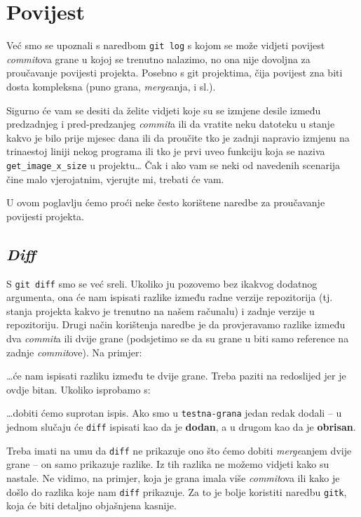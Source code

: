 \chapter*{Povijest}

Već smo se upoznali s naredbom \verb+git log+ s kojom se može vidjeti povijest \emph{commit}ova grane u kojoj se trenutno nalazimo, no ona nije dovoljna za proučavanje povijesti projekta.
Posebno s git projektima, čija povijest zna biti dosta kompleksna (puno grana, \emph{merge}anja, i sl.).

Sigurno će vam se desiti da želite vidjeti koje su se izmjene desile između predzadnjeg i pred-predzanjeg \emph{commit}a ili da vratite neku datoteku u stanje kakvo je bilo prije mjesec dana ili da proučite tko je zadnji napravio izmjenu na trinaestoj liniji nekog programa ili tko je prvi uveo funkciju koja se naziva \verb+get_image_x_size+ u projektu\dots 
Čak i ako vam se neki od navedenih scenarija čine malo vjerojatnim, vjerujte mi, trebati će vam.

U ovom poglavlju ćemo proći neke često korištene naredbe za proučavanje povijesti projekta.

\section*{\emph{Diff}}

S \verb+git diff+ smo se već sreli. 
Ukoliko ju pozovemo bez ikakvog dodatnog argumenta, ona će nam ispisati razlike između radne verzije repozitorija (tj. stanja projekta kakvo je trenutno na našem računalu) i zadnje verzije u repozitoriju.
Drugi način korištenja naredbe je da provjeravamo razlike između dva \emph{commit}a ili dvije grane (podsjetimo se da su grane u biti samo reference na zadnje \emph{commit}ove).
Na primjer:


\dots{}će nam ispisati razliku između te dvije grane. 
Treba paziti na redoslijed jer je ovdje bitan.
Ukoliko isprobamo s:


\dots{}dobiti ćemo suprotan ispis. 
Ako smo u \verb+testna-grana+ jedan redak dodali -- u jednom slučaju će \verb+diff+ ispisati kao da je \textbf{dodan}, a u drugom kao da je \textbf{obrisan}.

Treba imati na umu da \verb+diff+ ne prikazuje ono što ćemo dobiti \emph{merge}anjem dvije grane -- on samo prikazuje razlike.
Iz tih razlika ne možemo vidjeti kako su nastale.
Ne vidimo, na primjer, koja je grana imala više \emph{commit}ova ili kako je došlo do razlika koje nam \verb+diff+ prikazuje.
Za to je bolje koristiti naredbu \verb+gitk+, koja će biti detaljno objašnjena kasnije.

